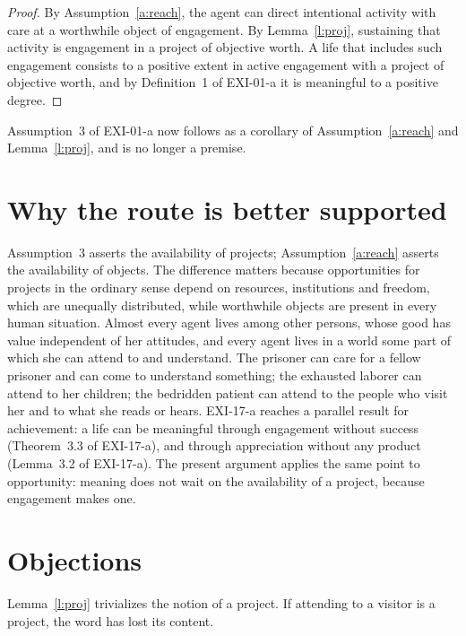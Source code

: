 \documentclass{situationist-preprint}
\begin{document}
\begin{proof}
By Assumption~\ref{a:reach}, the agent can direct intentional activity with care at a worthwhile object of engagement. By Lemma~\ref{l:proj}, sustaining that activity is engagement in a project of objective worth. A life that includes such engagement consists to a positive extent in active engagement with a project of objective worth, and by Definition~1 of EXI-01-a it is meaningful to a positive degree.
\end{proof}

Assumption~3 of EXI-01-a now follows as a corollary of Assumption~\ref{a:reach} and Lemma~\ref{l:proj}, and is no longer a premise.

\section{Why the route is better supported}

Assumption~3 asserts the availability of projects; Assumption~\ref{a:reach} asserts the availability of objects. The difference matters because opportunities for projects in the ordinary sense depend on resources, institutions and freedom, which are unequally distributed, while worthwhile objects are present in every human situation. Almost every agent lives among other persons, whose good has value independent of her attitudes, and every agent lives in a world some part of which she can attend to and understand. The prisoner can care for a fellow prisoner and can come to understand something; the exhausted laborer can attend to her children; the bedridden patient can attend to the people who visit her and to what she reads or hears. EXI-17-a reaches a parallel result for achievement: a life can be meaningful through engagement without success (Theorem~3.3 of EXI-17-a), and through appreciation without any product (Lemma~3.2 of EXI-17-a). The present argument applies the same point to opportunity: meaning does not wait on the availability of a project, because engagement makes one.

\section{Objections}

\begin{objection}
Lemma~\ref{l:proj} trivializes the notion of a project. If attending to a visitor is a project, the word has lost its content.
\end{objection}
\end{document}
